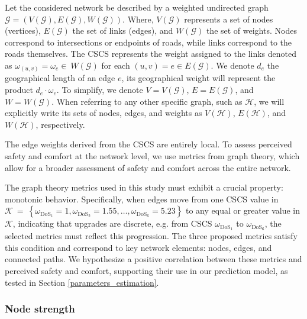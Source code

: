 \documentclass[lettersize,journal]{IEEEtran}
\begin{document}
Let the considered network be described by a weighted undirected graph $\mathcal{G} = (V(\mathcal{G}), E(\mathcal{G}), W(\mathcal{G}))$. Where, $V(\mathcal{G})$ represents a set of nodes (vertices), $E(\mathcal{G})$ the set of links  (edges), and $W(\mathcal{G})$ the set of weights. Nodes correspond to intersections or endpoints of roads, while links correspond to the roads themselves. The CSCS represents the weight assigned to the links denoted as $\omega_{(u,v)} = \omega_{e} \in~W(\mathcal{G})$ for each $(u,v)=e \in E(\mathcal{G})$. We denote $d_e$ the geographical length of an edge $e$, its geographical weight will represent the product $d_e \cdot \omega_e$. To simplify, we denote $V = V(\mathcal{G})$, $E = E(\mathcal{G})$, and $W = W(\mathcal{G})$. When referring to any other specific graph, such as $\mathcal{H}$, we will explicitly write its sets of nodes, edges, and weights as $V(\mathcal{H})$, $E(\mathcal{H})$, and $W(\mathcal{H})$, respectively.


The edge weights derived from the CSCS are entirely local. To assess perceived safety and comfort at the network level, we use metrics from graph theory, which allow for a broader assessment of safety and comfort across the entire network.

The graph theory metrics used in this study must exhibit a crucial property: monotonic behavior. Specifically, when edges move from one CSCS value in $\mathcal{K}~=~\left \{\omega_{\text{DoS}_1}=1, \omega_{\text{DoS}_2}= 1.55, \ldots, \omega_{\text{DoS}_6}=5.23\right\}$ to any equal or greater value in $\mathcal{K}$, indicating that upgrades are discrete, e.g. from CSCS $\omega_{\text{DoS}_1}$ to $\omega_{\text{DoS}_6}$, the selected metrics must reflect this progression. The three proposed metrics satisfy this condition and correspond to key network elements: nodes, edges, and connected paths. We hypothesize a positive correlation between these metrics and perceived safety and comfort, supporting their use in our prediction model, as tested in Section \ref{parameters_estimation}.


\subsubsection{Node strength}
\label{degree_distribution}


\end{document}
